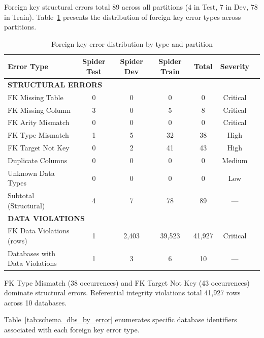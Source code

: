 \documentclass[print]{einformatica}
\begin{document}
Foreign key structural errors total 89 across all partitions (4 in Test, 7 in Dev, 78 in Train). Table~\ref{tab:schema_errors} presents the distribution of foreign key error types across partitions.

\begin{table}[ht]
    \caption{Foreign key error distribution by type and partition}
    \label{tab:schema_errors}
    \centering
    \footnotesize
    \begin{tabular}{lcccccc}
        \toprule
        \textbf{Error Type} & \textbf{Spider Test} & \textbf{Spider Dev} & \textbf{Spider Train} & \textbf{Total} & \textbf{Severity} \\
        \midrule
        \multicolumn{6}{l}{\textbf{STRUCTURAL ERRORS}} \\
        FK Missing Table & 0 & 0 & 0 & 0 & Critical \\
        FK Missing Column & 3 & 0 & 5 & 8 & Critical \\
        FK Arity Mismatch & 0 & 0 & 0 & 0 & Critical \\
        FK Type Mismatch & 1 & 5 & 32 & 38 & High \\
        FK Target Not Key & 0 & 2 & 41 & 43 & High \\
        Duplicate Columns & 0 & 0 & 0 & 0 & Medium \\
        Unknown Data Types & 0 & 0 & 0 & 0 & Low \\
        Subtotal (Structural) & 4 & 7 & 78 & 89 & --- \\
        \multicolumn{6}{l}{\textbf{DATA VIOLATIONS}} \\
        FK Data Violations (rows) & 1 & 2,403 & 39,523 & 41,927 & Critical \\
        Databases with Data Violations & 1 & 3 & 6 & 10 & --- \\
        \bottomrule
    \end{tabular}
\end{table}

FK Type Mismatch (38 occurrences) and FK Target Not Key (43 occurrences) dominate structural errors. Referential integrity violations total 41,927 rows across 10 databases.

Table~\ref{tab:schema_dbs_by_error} enumerates specific database identifiers associated with each foreign key error type.
\end{document}
